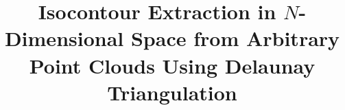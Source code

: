 \title{Isocontour Extraction in $N$-Dimensional Space from Arbitrary Point
Clouds Using Delaunay Triangulation}
\author{}
\date{}

\newcommand{\PaperAbstract}{%
This paper extends the generalized isocontouring approach introduced by
\cite{OellerichBuescherDegel2023_1000162443} by proposing a more structured
and computationally efficient variant. While the original method utilized
arbitrary planes in three-dimensional space, the present approach restricts
the isocontouring process to hyperplanes normal to coordinate axes. Although
this reduces generality, it enables a systematic and scalable extension to
spaces of arbitrary dimensionality.}

\newif\ifshowbibliography
\showbibliographytrue
